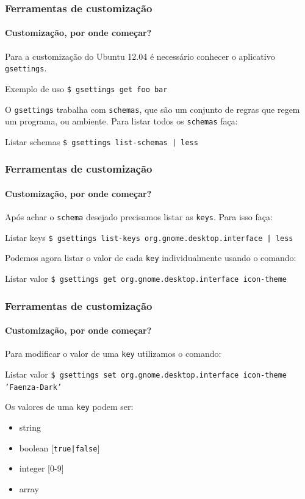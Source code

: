 \begin{frame}\frametitle{Ferramentas de customização}\framesubtitle{Customização, por onde começar?}

Para a customização do Ubuntu 12.04 é necessário conhecer o aplicativo \texttt{gsettings}.

\begin{block}{Exemplo de uso}
\texttt{\$ gsettings get foo bar}
\end{block}

\medskip

O \texttt{gsettings} trabalha com \texttt{schemas}, que são um conjunto de regras que regem um programa,
ou ambiente. Para listar todos os \texttt{schemas} faça:

\begin{block}{Listar schemas}
\texttt{\$ gsettings list-schemas | less}
\end{block}

\end{frame}

\begin{frame}\frametitle{Ferramentas de customização}\framesubtitle{Customização, por onde começar?}

Após achar o \texttt{schema} desejado precisamos listar as \texttt{keys}. Para isso faça:

\begin{block}{Listar keys}
\texttt{\$ gsettings list-keys org.gnome.desktop.interface | less}
\end{block}

\medskip

Podemos agora listar o valor de cada \texttt{key} individualmente usando o comando:

\begin{block}{Listar valor}
\texttt{\$ gsettings get org.gnome.desktop.interface icon-theme}
\end{block}

\end{frame}

\begin{frame}\frametitle{Ferramentas de customização}\framesubtitle{Customização, por onde começar?}

Para modificar o valor de uma \texttt{key} utilizamos o comando:

\begin{block}{Listar valor}
\texttt{\$ gsettings set org.gnome.desktop.interface icon-theme 'Faenza-Dark'}
\end{block}

\medskip

Os valores de uma \texttt{key} podem ser:
\begin{itemize}
	\item string
	\item boolean [\texttt{true|false}]
	\item integer [0-9]
	\item array
\end{itemize}

\end{frame}

